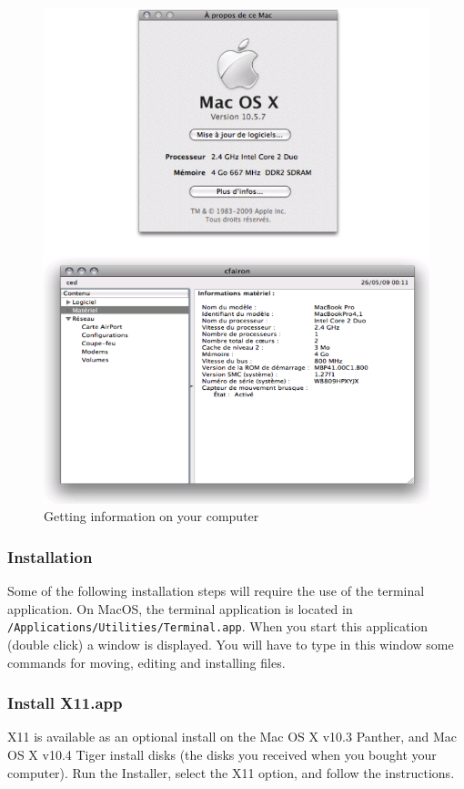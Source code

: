 \begin{figure}[!h]
\begin{center}
\includegraphics[width=13cm]{resources/img/fig-mac1.png}
\caption{Getting information on your computer\label{fig-mac1}}
\end{center}
\end{figure}

\clearpage

\subsubsection{Installation}
\noindent Some of the following installation steps will require the use of the
terminal application. On MacOS, the terminal application is located in 
\verb+/Applications/Utilities/Terminal.app+.  When you start this application
(double click) a window is displayed. You will have to type in this window 
some commands for moving, editing and installing files.

\subsubsection{Install X11.app}
\noindent X11 is available as an optional install on the Mac OS X v10.3 
Panther, and Mac OS X v10.4 Tiger install disks (the disks you received 
when you bought your computer). Run the Installer, 
select the X11 option, and follow the instructions.

